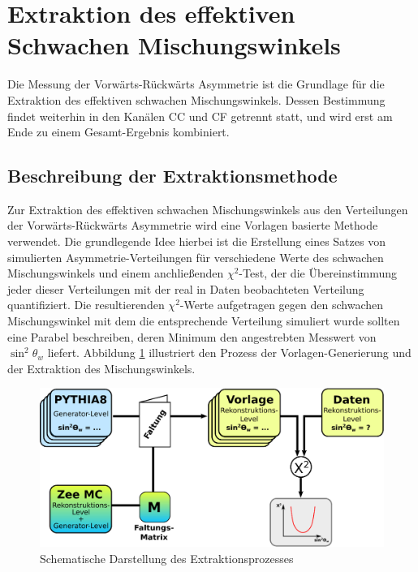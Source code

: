 \section{Extraktion des effektiven Schwachen Mischungswinkels}
\label{afb:sin2theta}

Die Messung der Vorwärts-Rückwärts Asymmetrie ist die Grundlage für die
Extraktion des effektiven schwachen Mischungswinkels. Dessen Bestimmung findet
weiterhin in den Kanälen \ac{CC} und \ac{CF} getrennt statt, und wird erst am
Ende zu einem Gesamt-Ergebnis kombiniert. 



\subsection{Beschreibung der Extraktionsmethode}
\label{afb:extraction_method}


Zur Extraktion des effektiven schwachen Mischungswinkels aus den Verteilungen
der Vorwärts-Rückwärts Asymmetrie wird eine Vorlagen basierte Methode
verwendet. Die grundlegende Idee hierbei ist die Erstellung eines Satzes von
simulierten Asymmetrie-Verteilungen für verschiedene Werte des schwachen
Mischungswinkels und einem anchließenden $\chi^2$-Test, der die Übereinstimmung
jeder dieser Verteilungen mit der real in Daten beobachteten Verteilung
quantifiziert. Die resultierenden $\chi^2$-Werte aufgetragen gegen den
schwachen Mischungswinkel mit dem die entsprechende Verteilung simuliert wurde
sollten eine Parabel beschreiben, deren Minimum den angestrebten Messwert von
$\sin^2\theta_w$ liefert. Abbildung \ref{fig:templates} illustriert den Prozess
der Vorlagen-Generierung und der Extraktion des Mischungswinkels.

\begin{figure}[h]
    \centering
    \includegraphics[width=1.0\textwidth]{img/templates}
    \caption[Schematische Darstellung des Extraktionsprozesses]
        {Schematische Darstellung des Extraktionsprozesses}
    \label{fig:templates}
\end{figure}

